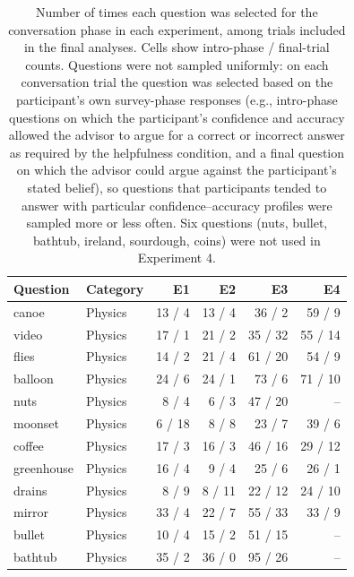 
\begin{table}[p]
\centering
\caption{Number of times each question was selected for the conversation phase in each experiment, among trials included in the final analyses. Cells show intro-phase / final-trial counts. Questions were not sampled uniformly: on each conversation trial the question was selected based on the participant's own survey-phase responses (e.g., intro-phase questions on which the participant's confidence and accuracy allowed the advisor to argue for a correct or incorrect answer as required by the helpfulness condition, and a final question on which the advisor could argue against the participant's stated belief), so questions that participants tended to answer with particular confidence--accuracy profiles were sampled more or less often. Six questions (nuts, bullet, bathtub, ireland, sourdough, coins) were not used in Experiment 4.}
\label{tab:question-freq}
\footnotesize
\setlength{\tabcolsep}{5pt}
\begin{tabular}{llrrrr}
\toprule
Question & Category & E1 & E2 & E3 & E4 \\
\midrule
canoe & Physics & 13 / 4 & 13 / 4 & 36 / 2 & 59 / 9 \\
video & Physics & 17 / 1 & 21 / 2 & 35 / 32 & 55 / 14 \\
flies & Physics & 14 / 2 & 21 / 4 & 61 / 20 & 54 / 9 \\
balloon & Physics & 24 / 6 & 24 / 1 & 73 / 6 & 71 / 10 \\
nuts & Physics & 8 / 4 & 6 / 3 & 47 / 20 & -- \\
moonset & Physics & 6 / 18 & 8 / 8 & 23 / 7 & 39 / 6 \\
coffee & Physics & 17 / 3 & 16 / 3 & 46 / 16 & 29 / 12 \\
greenhouse & Physics & 16 / 4 & 9 / 4 & 25 / 6 & 26 / 1 \\
drains & Physics & 8 / 9 & 8 / 11 & 22 / 12 & 24 / 10 \\
mirror & Physics & 33 / 4 & 22 / 7 & 55 / 33 & 33 / 9 \\
bullet & Physics & 10 / 4 & 15 / 2 & 51 / 15 & -- \\
bathtub & Physics & 35 / 2 & 36 / 0 & 95 / 26 & -- \\

\end{tabular}
\end{table}

